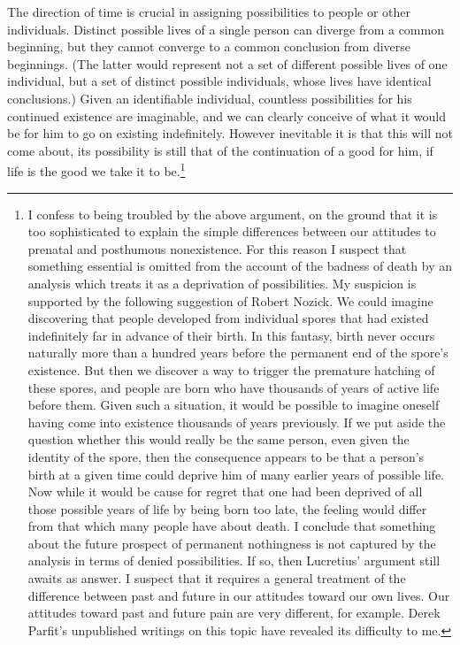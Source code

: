 The direction of time is crucial in assigning possibilities to people or other
individuals. Distinct possible lives of a single person can diverge from a
common beginning, but they cannot converge to a common conclusion from
diverse beginnings. (The latter would represent not a set of different possible
lives of one individual, but a set of distinct possible individuals, whose lives
have identical conclusions.) Given an identifiable individual, countless
possibilities for his continued existence are imaginable, and we can clearly
conceive of what it would be for him to go on existing indefinitely. However
inevitable it is that this will not come about, its possibility is still that of the
continuation of a good for him, if life is the good we take it to be.\footnote{I confess to being troubled by the above argument, on the ground that it is too sophisticated
to explain the simple differences between our attitudes to prenatal and posthumous
nonexistence. For this reason I suspect that something essential is omitted from the account
of the badness of death by an analysis which treats it as a deprivation of possibilities. My
suspicion is supported by the following suggestion of Robert Nozick. We could imagine
discovering that people developed from individual spores that had existed indefinitely far in
advance of their birth. In this fantasy, birth never occurs naturally more than a hundred years
before the permanent end of the spore's existence. But then we discover a way to trigger the
premature hatching of these spores, and people are born who have thousands of years of
active life before them. Given such a situation, it would be possible to imagine oneself having
come into existence thousands of years previously. If we put aside the question whether this
would really be the same person, even given the identity of the spore, then the consequence
appears to be that a person's birth at a given time could deprive him of many earlier years of
possible life. Now while it would be cause for regret that one had been deprived of all those
possible years of life by being born too late, the feeling would differ from that which many
people have about death. I conclude that something about the future prospect of permanent
nothingness is not captured by the analysis in terms of denied possibilities. If so, then Lucretius'
argument still awaits as answer. I suspect that it requires a general treatment of the difference
between past and future in our attitudes toward our own lives. Our attitudes toward past and
future pain are very different, for example. Derek Parfit's unpublished writings on this topic
have revealed its difficulty to me.}


